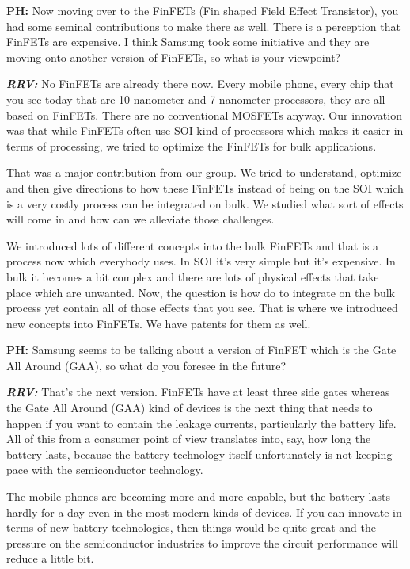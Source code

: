 \begin{multicols}{2}
\textbf{PH:} Now moving over to the FinFETs (Fin shaped Field Effect Transistor), you had some seminal contributions to make there as well. There is a perception that FinFETs are expensive. I think Samsung took some initiative and they are moving onto another version of FinFETs, so what is your viewpoint?

\textbf{\textit{RRV:}} No FinFETs are already there now. Every mobile phone, every chip that you see today that are 10 nanometer and 7 nanometer processors, they are all based on FinFETs. There are no conventional MOSFETs anyway. Our innovation was that while FinFETs often use SOI kind of processors which makes it easier in terms of processing, we tried to optimize the FinFETs for bulk applications.

That was a major contribution from our group. We tried to understand, optimize and then give directions to how these FinFETs instead of being on the SOI which is a very costly process can be integrated on bulk. We studied what sort of effects will come in and how can we alleviate those challenges.

We introduced lots of different concepts into the bulk FinFETs and that is a process now which everybody uses. In SOI it’s very simple but it’s expensive. In bulk it becomes a bit complex and there are lots of physical effects that take place which are unwanted. Now, the question is how do to integrate on the bulk process yet contain all of those effects that you see. That is where we introduced new concepts into FinFETs. We have patents for them as well.

\textbf{PH:} Samsung seems to be talking about a version of FinFET which is the Gate All Around (GAA), so what do you foresee in the future?

\textbf{\textit{RRV: }} That’s the next version. FinFETs have at least three side gates whereas the Gate All Around (GAA) kind of devices is the next thing that needs to happen if you want to contain the leakage currents, particularly the battery life. All of this from a consumer point of view translates into, say, how long the battery lasts, because the battery technology itself unfortunately is not keeping pace with the semiconductor technology.
 
 The mobile phones are becoming more and more capable, but the battery lasts hardly for a day even in the most modern kinds of devices. If you can innovate in terms of new battery technologies, then things would be quite great and the pressure on the semiconductor industries to improve the circuit performance will reduce a little bit.
 

\end{multicols}
